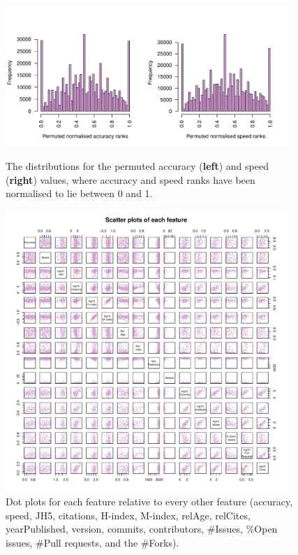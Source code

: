 \documentclass[fleqn,10pt]{SelfArx} %
\begin{document}
\begin{figure}[htb!]
\centering
\includegraphics[width=0.95\textwidth]{supplementary-distributions-permuted.pdf}\\
\caption{The distributions for the permuted accuracy ({\bf left}) and speed ({\bf right}) values, where accuracy and speed ranks have been normalised to lie between 0 and 1. 
}
\label{fig:metricDistributionsPerm}
\end{figure}

\clearpage

\begin{figure}[H]
\centering
\includegraphics[width=0.95\textwidth]{supplementary-figures-pairs.pdf}
\caption{Dot plots for each feature relative to every other feature
  (accuracy, speed, JH5, citations, H-index, M-index, relAge,
  relCites, yearPublished, version, commits, contributors, \#Issues,
\%Open issues, \#Pull requests, and the \#Forks).
}
\label{fig:metricPairs}
\end{figure}
\end{document}
